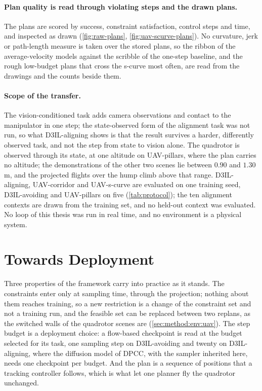 \paragraph{Plan quality is read through violating steps and the drawn plans.} The plans are scored by
success, constraint satisfaction, control steps and time, and inspected as drawn (\autoref{fig:raw-plans},
\autoref{fig:uav-scurve-plans}). No curvature, jerk or path-length measure is taken over the stored
plans, so the ribbon of the average-velocity models against the scribble of the one-step baseline, and
the rough low-budget plans that cross the s-curve most often, are read from the drawings and the counts
beside them.

\paragraph{Scope of the transfer.} The vision-conditioned task adds camera observations and contact to
the manipulator in one step; the state-observed form of the alignment task was not run, so what
D3IL-aligning shows is that the result survives a harder, differently observed task, and not the step
from state to vision alone. The quadrotor is observed through its state, at one altitude on UAV-pillars,
where the plan carries no altitude; the demonstrations of the other two scenes lie between $0.90$ and
$1.30$\,m, and the projected flights over the hump climb above that range.
D3IL-aligning, UAV-corridor and UAV-s-curve are evaluated on one training seed, D3IL-avoiding and
UAV-pillars on five (\autoref{tab:protocol}); the ten alignment contexts are drawn from the training set, and no
held-out context was evaluated. No loop of this thesis was run in real time, and no environment is a physical system.

\section{Towards Deployment}\label{sec:disc:practice}

Three properties of the framework carry into practice as it stands. The constraints enter only at
sampling time, through the projection; nothing about them reaches training, so a new restriction is a
change of the constraint set and not a training run, and the feasible set can be replaced between two
replans, as the switched walls of the quadrotor scenes are (\autoref{sec:method:env:uav}). The step
budget is a deployment choice: a flow-based checkpoint is read at the budget selected for its task,
one sampling step on D3IL-avoiding and twenty on D3IL-aligning, where the diffusion model of
\ac{DPCC}, with the sampler inherited here, needs one checkpoint per budget.
And the plan is a sequence of positions that a tracking controller follows, which is what let one
planner fly the quadrotor unchanged.

